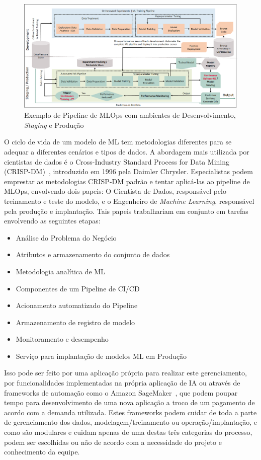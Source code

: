 \documentclass[portugues]{ic-tese}
\begin{document}
\begin{figure}[H]
\centering
\includegraphics[scale=0.33]{images/mlops-pipeline-example.png}
\caption {Exemplo de Pipeline de MLOps com ambientes de Desenvolvimento, \textit{Staging} e Produção~\citep{Tripathi_2021}}
\label{fig:MLOpsPipeline}
\end{figure}

O ciclo de vida de um modelo de ML tem metodologias diferentes para se adequar a diferentes cenários e tipos de dados. A abordagem mais utilizada por cientistas de dados é o Cross-Industry Standard Process for Data Mining (CRISP-DM)~\citep{Shearer_2000}, introduzido em 1996 pela Daimler Chrysler. Especialistas podem emprestar as metodologias CRISP-DM padrão e tentar aplicá-las ao pipeline de MLOps, envolvendo dois papeis: O Cientista de Dados, responsável pelo treinamento e teste do modelo, e o Engenheiro de \textit{Machine Learning}, responsável pela produção e implantação. Tais papeis trabalhariam em conjunto em tarefas envolvendo as seguintes etapas:

\begin{itemize}
    \item Análise do Problema do Negócio
    \item Atributos e armazenamento do conjunto de dados
    \item Metodologia analítica de ML
    \item Componentes de um Pipeline de CI/CD
    \item Acionamento automatizado do Pipeline
    \item Armazenamento de registro de modelo
    \item Monitoramento e desempenho
    \item Serviço para implantação de modelos ML em Produção
\end{itemize}

Isso pode ser feito por uma aplicação própria para realizar este gerenciamento, por funcionalidades implementadas na própria aplicação de IA ou através de frameworks de automação como o Amazon SageMaker~\citep{Amazon_2023}, que podem poupar tempo para desenvolvimento de uma nova aplicação a troco de um pagamento de acordo com a demanda utilizada. Estes frameworks podem cuidar de toda a parte de gerenciamento dos dados, modelagem/treinamento ou operação/implantação, e como são modulares e cuidam apenas de uma destas três categorias do processo, podem ser escolhidas ou não de acordo com a necessidade do projeto e conhecimento da equipe.
\end{document}
